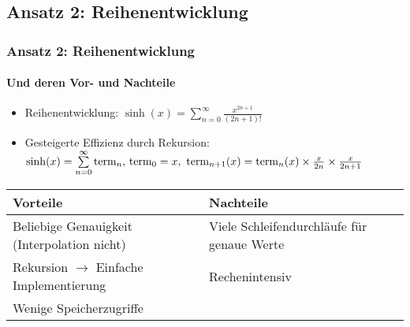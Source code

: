 	\begin{frame}
		\section{Ansatz 2: Reihenentwicklung}
		\frametitle{Ansatz 2: Reihenentwicklung}
		\framesubtitle{Und deren Vor- und Nachteile}
		\begin{itemize}
			\item Reihenentwicklung: \begin{math}\sinh(x) = \sum\limits_{n=0}^{\infty} \frac{x^{2n+1}}{(2n+1)!} \end{math}
			\item Gesteigerte Effizienz durch Rekursion: $\sinh(x) = \sum\limits_{n=0}^{\infty} \term_{n}, \newline \term_{0} = x, \ \term_{n+1}(x) = \term_{n}(x) \times \frac{x}{2n} \times \frac{x}{2n+1}$
		\end{itemize}
	\begin{center}
		\begin{tabularx}{\textwidth}{*{2}{|X}|}
			\hline
			\textbf{Vorteile} & \textbf{Nachteile} \\
			\hline 
			\hline
			Beliebige Genauigkeit \newline(Interpolation nicht) & Viele Schleifendurchläufe für \newline genaue Werte \\
			\hline
			Rekursion $\rightarrow$ Einfache \newline Implementierung  & Rechenintensiv \\
			\hline
			Wenige Speicherzugriffe &  \\
			\hline
		\end{tabularx}
	\end{center}
	\end{frame}
